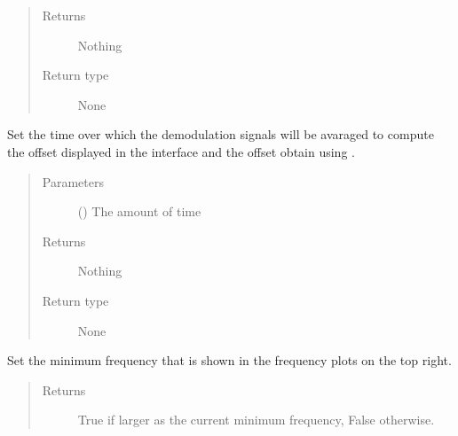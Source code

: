 \documentclass[letterpaper,10pt,english]{sphinxmanual}
\begin{document}
\begin{fulllineitems}
\begin{fulllineitems}
\begin{quote}
\begin{description}
\item[{Returns}] \leavevmode
\sphinxAtStartPar
Nothing

\item[{Return type}] \leavevmode
\sphinxAtStartPar
None

\end{description}\end{quote}

\end{fulllineitems}


\begin{fulllineitems}
\label{\detokenize{index:TiePieLCR_settings.TiePieLCR_settings.set_integration_time}}
\sphinxAtStartPar
Set the time over which the demodulation signals will be avaraged to compute the offset displayed in the interface and the offset obtain using .
\begin{quote}\begin{description}
\item[{Parameters}] \leavevmode
\sphinxAtStartPar
{} () \textendash{} The amount of time

\item[{Returns}] \leavevmode
\sphinxAtStartPar
Nothing

\item[{Return type}] \leavevmode
\sphinxAtStartPar
None

\end{description}\end{quote}

\end{fulllineitems}


\begin{fulllineitems}
\label{\detokenize{index:TiePieLCR_settings.TiePieLCR_settings.set_maximum_plot_frequency}}
\sphinxAtStartPar
Set the minimum frequency that is shown in the frequency plots on the top right.
\begin{quote}\begin{description}
\item[{Returns}] \leavevmode
\sphinxAtStartPar
True if larger as the current minimum frequency, False otherwise.


\end{description}
\end{quote}
\end{fulllineitems}
\end{fulllineitems}
\end{document}
